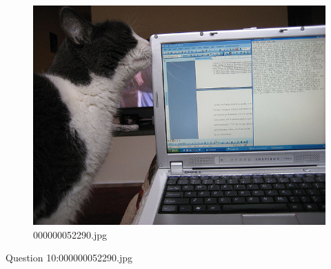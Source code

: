     \begin{figure}[h]
        \centering
        \includegraphics[width=0.8\linewidth]{../image set/easy/000000052290.jpg}
        \caption{000000052290.jpg}
    \end{figure}
    Question 10:000000052290.jpg
